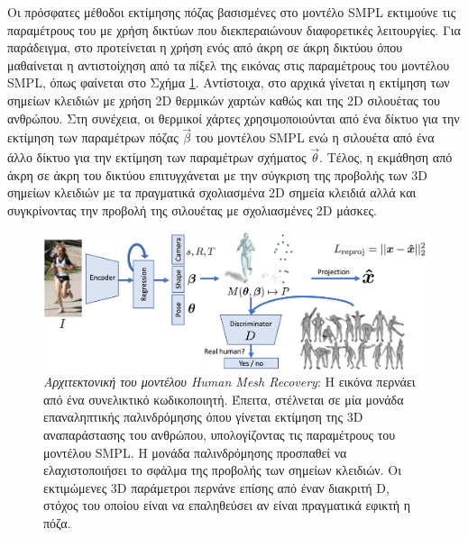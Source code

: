 Οι πρόσφατες μέθοδοι εκτίμησης πόζας βασισμένες στο μοντέλο SMPL εκτιμούνε τις παραμέτρους του με χρήση δικτύων που διεκπεραιώνουν διαφορετικές λειτουργίες. Για παράδειγμα, στο \cite{hmr_paper} προτείνεται η χρήση ενός από άκρη σε άκρη δικτύου όπου μαθαίνεται η αντιστοίχηση από τα πίξελ της εικόνας στις παραμέτρους του μοντέλου SMPL, όπως φαίνεται στο Σχήμα \ref{fig:hmr_architecture}. Αντίστοιχα, στο \cite{estimate_from_single_color_paper} αρχικά γίνεται η εκτίμηση των σημείων κλειδιών με χρήση 2D θερμικών χαρτών καθώς και της 2D σιλουέτας του ανθρώπου. Στη συνέχεια, οι θερμικοί χάρτες χρησιμοποιούνται από ένα δίκτυο για την εκτίμηση των παραμέτρων πόζας $\vec{\beta}$ του μοντέλου SMPL ενώ η σιλουέτα από ένα άλλο δίκτυο για την εκτίμηση των παραμέτρων σχήματος $\vec{\theta}$. Τέλος, η εκμάθηση από άκρη σε άκρη του δικτύου επιτυγχάνεται με την σύγκριση της προβολής των 3D σημείων κλειδιών με τα πραγματικά σχολιασμένα 2D σημεία κλειδιά αλλά και συγκρίνοντας την προβολή της σιλουέτας με σχολιασμένες 2D μάσκες.

 \begin{figure}[h!]
	\centering
	\includegraphics[scale=1.7]{images/chapter2/3d_pose_estimation/hmr_architecture.jpg}
	\caption[Αρχιτεκτονική του μοντέλου Human Mesh Recovery]{\textsl{Αρχιτεκτονική του μοντέλου Human Mesh Recovery}: H εικόνα περνάει από ένα συνελικτικό κωδικοποιητή. Έπειτα, στέλνεται σε μία μονάδα επαναληπτικής παλινδρόμησης όπου γίνεται εκτίμηση της 3D αναπαράστασης του ανθρώπου, υπολογίζοντας τις παραμέτρους του μοντέλου SMPL. Η μονάδα παλινδρόμησης προσπαθεί να ελαχιστοποιήσει το σφάλμα της προβολής των σημείων κλειδιών. Οι εκτιμώμενες 3D παράμετροι περνάνε επίσης από έναν διακριτή D, στόχος του οποίου είναι να επαληθεύσει αν είναι πραγματικά εφικτή η πόζα.}
	\label{fig:hmr_architecture}
\end{figure}
